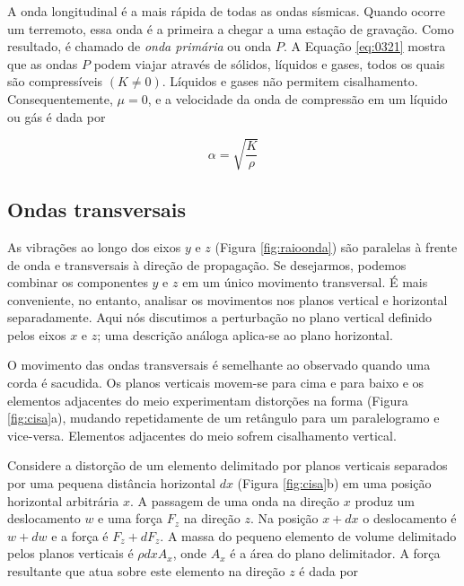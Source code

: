 \documentclass[]{book}
\theoremstyle{definition}
\theoremstyle{definition}
\theoremstyle{definition}
\theoremstyle{remark}
\begin{document}
A onda longitudinal é a mais rápida de todas as ondas sísmicas. Quando ocorre um terremoto, essa onda é a primeira a chegar a uma estação de gravação. Como resultado, é chamado de \emph{onda primária} ou onda \(P\). A Equação \eqref{eq:0321} mostra que as ondas \(P\) podem viajar através de sólidos, líquidos e gases, todos os quais são compressíveis \((K\neq 0)\). Líquidos e gases não permitem cisalhamento. Consequentemente, \(\mu=0\), e a velocidade da onda de compressão em um líquido ou gás é dada por

\begin{equation}
\alpha=\sqrt{\frac{K}{\rho}} \label{eq:0322}
\end{equation}

\hypertarget{ondas-transversais}{%
\subsection{Ondas transversais}\label{ondas-transversais}}

As vibrações ao longo dos eixos \(y\) e \(z\) (Figura \ref{fig:raioonda}) são paralelas à frente de onda e transversais à direção de propagação. Se desejarmos, podemos combinar os componentes \(y\) e \(z\) em um único movimento transversal. É mais conveniente, no entanto, analisar os movimentos nos planos vertical e horizontal separadamente. Aqui nós discutimos a perturbação no plano vertical definido pelos eixos \(x\) e \(z\); uma descrição análoga aplica-se ao plano horizontal.

O movimento das ondas transversais é semelhante ao observado quando uma corda é sacudida. Os planos verticais movem-se para cima e para baixo e os elementos adjacentes do meio experimentam distorções na forma (Figura \ref{fig:cisa}a), mudando repetidamente de um retângulo para um paralelogramo e vice-versa. Elementos adjacentes do meio sofrem cisalhamento vertical.

Considere a distorção de um elemento delimitado por planos verticais separados por uma pequena distância horizontal \(dx\) (Figura \ref{fig:cisa}b) em uma posição horizontal arbitrária \(x\). A passagem de uma onda na direção \(x\) produz um deslocamento \(w\) e uma força \(F_z\) na direção \(z\). Na posição \(x+dx\) o deslocamento é \(w+dw\) e a força é \(F_z+dF_z\). A massa do pequeno elemento de volume delimitado pelos planos verticais é \(\rho dxA_x\), onde \(A_x\) é a área do plano delimitador. A força resultante que atua sobre este elemento na direção \(z\) é dada por
\end{document}
